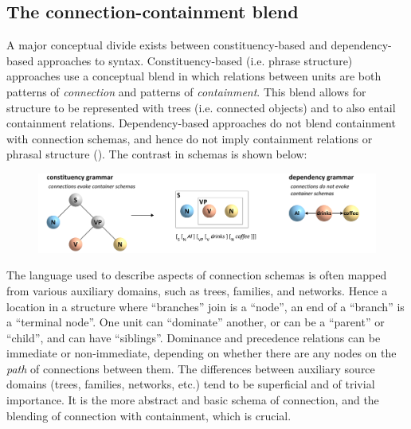 \subsection{The connection-containment blend}

A major conceptual divide exists between constituency-based and dependency-based approaches to syntax. Constituency-based (i.e. phrase structure) approaches use a conceptual blend in which relations between units are both patterns of \textit{connection} and patterns of \textit{containment}. This blend allows for structure to be represented with trees (i.e. connected objects) and to also entail containment relations. Dependency-based approaches do not blend containment with connection schemas, and hence do not imply containment relations or phrasal structure (\citealt{Hays1964,Melʹčuk1988,Osborne2006,OsborneEtAl2011,Percival1990,Tesnière2018}). The contrast in schemas is shown below: 

  
\begin{figure}
\includegraphics[width=\textwidth]{figures/Tilsen-img34.png}
\caption{\missingcaption}
\label{fig:}
\end{figure}
 

  The language used to describe aspects of connection schemas is often mapped from various auxiliary domains, such as trees, families, and networks. Hence a location in a structure where “branches” join is a “node”, an end of a “branch” is a “terminal node”. One unit can “dominate” another, or can be a “parent” or “child”, and can have “siblings”. Dominance and precedence relations can be immediate or non-immediate, depending on whether there are any nodes on the \textit{path} of connections between them. The differences between auxiliary source domains (trees, families, networks, etc.) tend to be superficial and of trivial importance. It is the more abstract and basic schema of connection, and the blending of connection with containment, which is crucial.   

